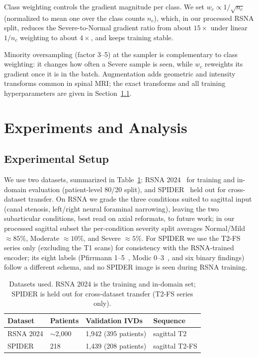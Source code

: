 \documentclass[runningheads]{llncs}
\begin{document}
Class weighting controls the gradient magnitude per class. We set $w_c \propto 1/\sqrt{n_c}$ (normalized to mean one over the class counts $n_c$), which, in our processed RSNA split, reduces the Severe-to-Normal gradient ratio from about $15\times$ under linear $1/n_c$ weighting to about $4\times$, and keeps training stable.

Minority oversampling (factor 3--5) at the sampler is complementary to class weighting: it changes how often a Severe sample is seen, while $w_c$ reweights its gradient once it is in the batch. Augmentation adds geometric and intensity transforms common in spinal MRI; the exact transforms and all training hyperparameters are given in Section~\ref{exp1}.

\section{Experiments and Analysis}\label{sec4}

\subsection{Experimental Setup}\label{exp1}

We use two datasets, summarized in Table~\ref{tab:datasets}: RSNA 2024~\cite{kaggle2024} for training and in-domain evaluation (patient-level 80/20 split), and SPIDER~\cite{vandergraaf2024spider} held out for cross-dataset transfer. On RSNA we grade the three conditions suited to sagittal input (canal stenosis, left/right neural foraminal narrowing), leaving the two subarticular conditions, best read on axial reformats, to future work; in our processed sagittal subset the per-condition severity split averages Normal/Mild $\approx 85\%$, Moderate $\approx 10\%$, and Severe $\approx 5\%$. For SPIDER we use the T2-FS series only (excluding the T1 scans) for consistency with the RSNA-trained encoder; its eight labels (Pfirrmann 1--5~\cite{pfirrmann2001}, Modic 0--3~\cite{modic1988}, and six binary findings) follow a different schema, and no SPIDER image is seen during RSNA training.

\begin{table}[ht]
\centering
\caption{Datasets used. RSNA 2024 is the training and in-domain set; SPIDER is held out for cross-dataset transfer (T2-FS series only).}
\label{tab:datasets}
\footnotesize
\begin{tabular}{@{}llll@{}}
\toprule
Dataset & Patients & Validation IVDs & Sequence \\
\midrule
RSNA 2024 & $\sim$2{,}000 & 1{,}942 (395 patients) & sagittal T2 \\
SPIDER & 218 & 1{,}439 (208 patients) & sagittal T2-FS \\
\bottomrule
\end{tabular}
\end{table}
\end{document}
